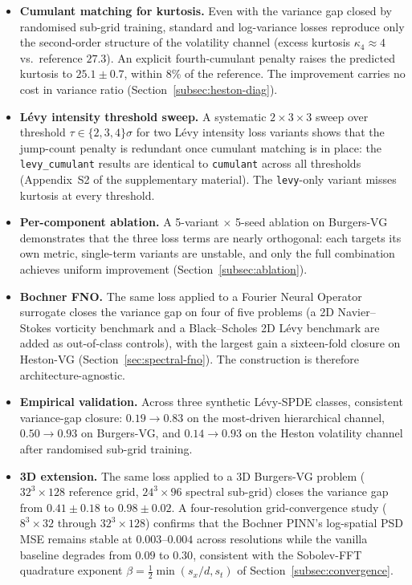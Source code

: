 \documentclass[review,12pt]{elsarticle}
\begin{document}
\begin{itemize}
\item \textbf{Cumulant matching for kurtosis.} Even with the variance
gap closed by randomised sub-grid training, standard and log-variance
losses reproduce only the second-order structure of the volatility
channel (excess kurtosis \(\kappa_4 \approx 4\) vs.\ reference
\(27.3\)). An explicit fourth-cumulant penalty raises the predicted
kurtosis to \(25.1 \pm 0.7\), within 8\% of the reference. The
improvement carries no cost in variance ratio
(Section~\ref{subsec:heston-diag}).

\item \textbf{L\'evy intensity threshold sweep.} A systematic
\(2\times3\times3\) sweep over threshold \(\tau \in \{2, 3, 4\}\sigma\)
for two L\'evy intensity loss variants shows that the jump-count
penalty is redundant once cumulant matching is in place: the
\texttt{levy\_cumulant} results are identical to \texttt{cumulant}
across all thresholds (Appendix~S2 of the supplementary material). The
\texttt{levy}-only variant misses kurtosis at every threshold.

\item \textbf{Per-component ablation.} A 5-variant \(\times\) 5-seed
ablation on Burgers-VG demonstrates that the three loss terms are
nearly orthogonal: each targets its own metric, single-term
variants are unstable, and only the full combination achieves
uniform improvement (Section~\ref{subsec:ablation}).

\item \textbf{Bochner FNO.} The same loss applied to a
Fourier Neural Operator surrogate closes the variance gap on four
of five problems (a 2D Navier--Stokes vorticity benchmark and a
Black--Scholes 2D L\'evy benchmark are added as out-of-class
controls), with the largest gain a sixteen-fold closure on
Heston-VG (Section~\ref{sec:spectral-fno}). The construction is
therefore architecture-agnostic.

\item \textbf{Empirical validation.} Across three synthetic L\'evy-SPDE
classes, consistent variance-gap closure: \(0.19 \to 0.83\) on the
most-driven hierarchical channel, \(0.50 \to 0.93\) on Burgers-VG,
and \(0.14 \to 0.93\) on the Heston volatility channel after
randomised sub-grid training.

\item \textbf{3D extension.} The same loss applied to a 3D Burgers-VG
problem (\(32^3 \times 128\) reference grid, \(24^3 \times 96\)
spectral sub-grid) closes the variance gap from \(0.41 \pm 0.18\) to
\(0.98 \pm 0.02\). A four-resolution grid-convergence study
(\(8^3 \times 32\) through \(32^3 \times 128\)) confirms that the
Bochner PINN's log-spatial PSD MSE remains stable at \(0.003\)--\(0.004\)
across resolutions while the vanilla baseline degrades from \(0.09\) to
\(0.30\), consistent with the Sobolev-FFT quadrature exponent
\(\beta = \tfrac12 \min(s_x/d, s_t)\) of Section~\ref{subsec:convergence}.


\end{itemize}
\end{document}
